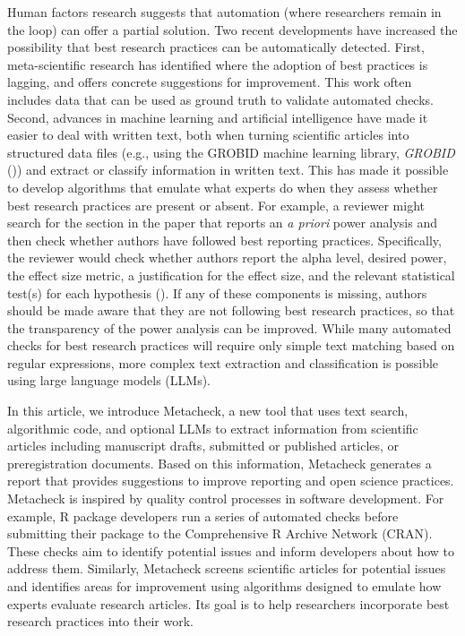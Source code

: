\documentclass[
  letterpaper,
  12pt]{article}
\begin{document}
Human factors research suggests that automation (where researchers
remain in the loop) can offer a partial solution. Two recent
developments have increased the possibility that best research practices
can be automatically detected. First, meta-scientific research has
identified where the adoption of best practices is lagging, and offers
concrete suggestions for improvement. This work often includes data that
can be used as ground truth to validate automated checks. Second,
advances in machine learning and artificial intelligence have made it
easier to deal with written text, both when turning scientific articles
into structured data files (e.g., using the GROBID machine learning
library, \emph{GROBID} ()) and
extract or classify information in written text. This has made it
possible to develop algorithms that emulate what experts do when they
assess whether best research practices are present or absent. For
example, a reviewer might search for the section in the paper that
reports an \emph{a priori} power analysis and then check whether authors
have followed best reporting practices. Specifically, the reviewer would
check whether authors report the alpha level, desired power, the effect
size metric, a justification for the effect size, and the relevant
statistical test(s) for each hypothesis
(). If any of
these components is missing, authors should be made aware that they are
not following best research practices, so that the transparency of the
power analysis can be improved. While many automated checks for best
research practices will require only simple text matching based on
regular expressions, more complex text extraction and classification is
possible using large language models (LLMs).

In this article, we introduce Metacheck, a new tool that uses text
search, algorithmic code, and optional LLMs to extract information from
scientific articles including manuscript drafts, submitted or published
articles, or preregistration documents. Based on this information,
Metacheck generates a report that provides suggestions to improve
reporting and open science practices. Metacheck is inspired by quality
control processes in software development. For example, R package
developers run a series of automated checks before submitting their
package to the Comprehensive R Archive Network (CRAN). These checks aim
to identify potential issues and inform developers about how to address
them. Similarly, Metacheck screens scientific articles for potential
issues and identifies areas for improvement using algorithms designed to
emulate how experts evaluate research articles. Its goal is to help
researchers incorporate best research practices into their work.
\end{document}
